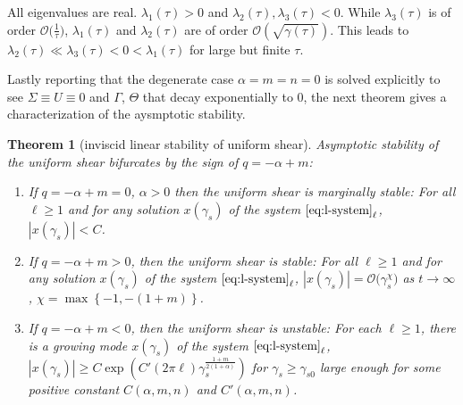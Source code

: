 \documentclass[a4paper,11pt]{article}
\def\l{(2\pi \ell)}
\def\k{(2\pi \ell)}
\newtheorem{theorem}{Theorem}
\theoremstyle{remark}
\begin{document}

All eigenvalues are real. $\lambda_1(\tau)>0$ and $\lambda_2(\tau),\lambda_3(\tau)<0$. While $\lambda_3(\tau)$ is of order $\mathcal{O}\big(\frac{1}{\tau}\big)$, $\lambda_1(\tau)$ and $\lambda_2(\tau)$ are of order $\mathcal{O}(\sqrt{\gamma(\tau)})$. This leads to $\lambda_2(\tau) \ll \lambda_3(\tau) < 0 < \lambda_1(\tau)$ for large but finite $\tau$.

Lastly reporting that the degenerate case $\alpha=m=n=0$ is solved explicitly to see $\Sigma\equiv U \equiv 0$ and $\Gamma$, $\Theta$ that decay exponentially to $0$, the next theorem gives a characterization of the aysmptotic stability.
\begin{theorem}[inviscid linear stability of uniform shear] \label{thm:3} Asymptotic stability of the uniform shear bifurcates by the sign of $q=-\alpha+m$:
 \begin{enumerate}
  \item If $q=-\alpha+m=0$, $\alpha>0$ then the uniform shear is marginally stable: For all $\ell\ge 1$ and for any solution $x(\gamma_s)$ of the system $\eqref{eq:l-system}_\ell$, $|x(\gamma_s)| < C$.
  \item If $q=-\alpha+m>0$, then the uniform shear is stable: For all $\ell\ge 1$ and for any solution $x(\gamma_s)$ of the system $\eqref{eq:l-system}_\ell$, $|x(\gamma_s)| = \mathcal{O}\big(\gamma_s^{\chi}\big)$ as $t \rightarrow \infty$, $\chi = \max \left\{-1, -(1+m)\right\}$.
  \item If $q=-\alpha+m<0$, then the uniform shear is unstable: For each $\ell\ge 1$, there is a growing mode $x(\gamma_s)$ of the system $\eqref{eq:l-system}_\ell$, $|x(\gamma_s)| \ge C\exp\left(C'\l \gamma_s^{\frac{1+m}{2(1+\alpha)}}\right)$ for $\gamma_s\ge\gamma_{s0}$ large enough for some positive constant $C(\alpha,m,n)$ and $C'(\alpha,m,n)$.
 \end{enumerate}
\end{theorem}
\end{document}
